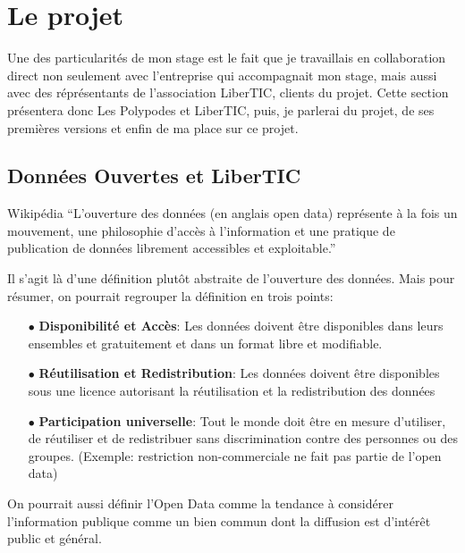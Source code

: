 \section{Le projet}

Une des particularités de mon stage est le fait que je travaillais en collaboration direct non seulement avec l'entreprise qui accompagnait mon stage, mais aussi avec des réprésentants de l'association LiberTIC, clients du projet. Cette section présentera donc Les Polypodes et LiberTIC, puis, je parlerai du projet, de ses premières versions et enfin de ma place sur ce projet.

\subsection{Données Ouvertes et LiberTIC}

\begin{aquote}{Wikipédia}
``L'ouverture des données (en anglais open data) représente à la fois un mouvement, une philosophie d'accès à l'information et une pratique de publication de données librement accessibles et exploitable.''
\end{aquote}

Il s'agit là d'une définition plutôt abstraite de l'ouverture des données. Mais pour résumer, on pourrait regrouper la définition en trois points:

\begin{itemize}
    \item[$\bullet$] \textbf{Disponibilité et Accès}: Les données doivent être disponibles dans leurs ensembles et gratuitement et dans un format libre et modifiable.
    \item[$\bullet$] \textbf{Réutilisation et Redistribution}: Les données doivent être disponibles sous une licence autorisant la réutilisation et la redistribution des données
    \item[$\bullet$] \textbf{Participation universelle}: Tout le monde doit être en mesure d'utiliser, de réutiliser et de redistribuer sans discrimination contre des personnes ou des groupes. (Exemple: restriction non-commerciale ne fait pas partie de l'open data)
\end{itemize}

On pourrait aussi définir l'Open Data comme la tendance à considérer l'information publique comme un bien commun dont la diffusion est d'intérêt public et général.

\vspace{1cm}

